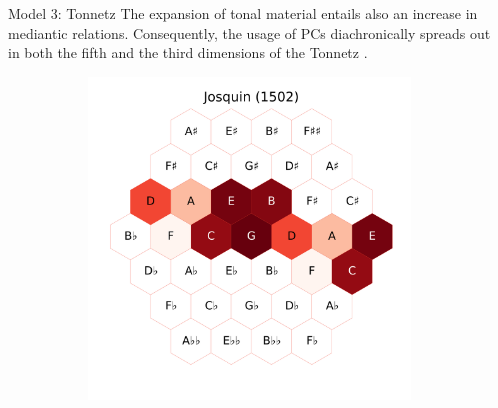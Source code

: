 \documentclass[final,cmyk]{beamer}
\begin{document}
\begin{frame}[t]
\begin{minipage}[t][.69\textheight][t]{\textwidth}
\begin{columns}[t]
\begin{column}{0.3\textwidth}
    \end{column}

    \begin{column}{0.3\textwidth}

			\begin{block}{Model 3: Tonnetz}
				The expansion of tonal material entails also an increase in \alert{mediantic relations}.
				Consequently, the usage of PCs diachronically spreads out in both the fifth
				and the third dimensions of the Tonnetz \autocite{Cohn2012}.

				\begin{figure}
				\centering
				\begin{subfigure}{\textwidth} %
					\includegraphics[width=\textwidth]{img/josquin_tonnetz.png}
				\end{subfigure}
				\begin{subfigure}{\textwidth} %

\end{subfigure}
\end{figure}
\end{block}
\end{column}
\end{columns}
\end{minipage}
\end{frame}
\end{document}
